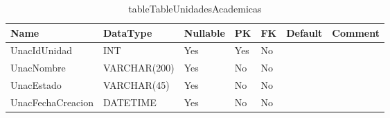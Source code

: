 \begin{table}[h]
	\caption{tableTableUnidadesAcademicas}
	\label{labelTableUnidadesAcademicas}
	\begin{tabular}{ |l|l|l|l|l|l|l| }
		\hline
		Name & DataType & Nullable & PK & FK & Default & Comment \\ \hline
		UnacIdUnidad & INT & Yes & Yes & No &  & \\ \hline 
		UnacNombre & VARCHAR(200) & Yes & No & No &  & \\ \hline 
		UnacEstado & VARCHAR(45) & Yes & No & No &  & \\ \hline 
		UnacFechaCreacion & DATETIME & Yes & No & No &  & \\ \hline 
		
	\end{tabular}
\end{table}
